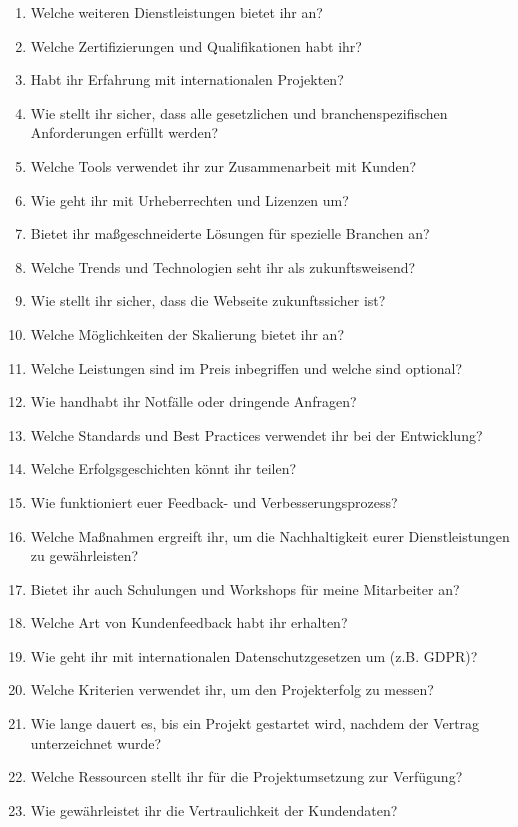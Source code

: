 \documentclass[a4paper,12pt]{article}
\begin{document}
\begin{enumerate}[resume]
    \item Welche weiteren Dienstleistungen bietet ihr an?
    \item Welche Zertifizierungen und Qualifikationen habt ihr?
    \item Habt ihr Erfahrung mit internationalen Projekten?
    \item Wie stellt ihr sicher, dass alle gesetzlichen und branchenspezifischen Anforderungen erfüllt werden?
    \item Welche Tools verwendet ihr zur Zusammenarbeit mit Kunden?
    \item Wie geht ihr mit Urheberrechten und Lizenzen um?
    \item Bietet ihr maßgeschneiderte Lösungen für spezielle Branchen an?
    \item Welche Trends und Technologien seht ihr als zukunftsweisend?
    \item Wie stellt ihr sicher, dass die Webseite zukunftssicher ist?
    \item Welche Möglichkeiten der Skalierung bietet ihr an?
    \item Welche Leistungen sind im Preis inbegriffen und welche sind optional?
    \item Wie handhabt ihr Notfälle oder dringende Anfragen?
    \item Welche Standards und Best Practices verwendet ihr bei der Entwicklung?
    \item Welche Erfolgsgeschichten könnt ihr teilen?
    \item Wie funktioniert euer Feedback- und Verbesserungsprozess?
    \item Welche Maßnahmen ergreift ihr, um die Nachhaltigkeit eurer Dienstleistungen zu gewährleisten?
    \item Bietet ihr auch Schulungen und Workshops für meine Mitarbeiter an?
    \item Welche Art von Kundenfeedback habt ihr erhalten?
    \item Wie geht ihr mit internationalen Datenschutzgesetzen um (z.B. GDPR)?
    \item Welche Kriterien verwendet ihr, um den Projekterfolg zu messen?
    \item Wie lange dauert es, bis ein Projekt gestartet wird, nachdem der Vertrag unterzeichnet wurde?
    \item Welche Ressourcen stellt ihr für die Projektumsetzung zur Verfügung?
    \item Wie gewährleistet ihr die Vertraulichkeit der Kundendaten?

\end{enumerate}
\end{document}
